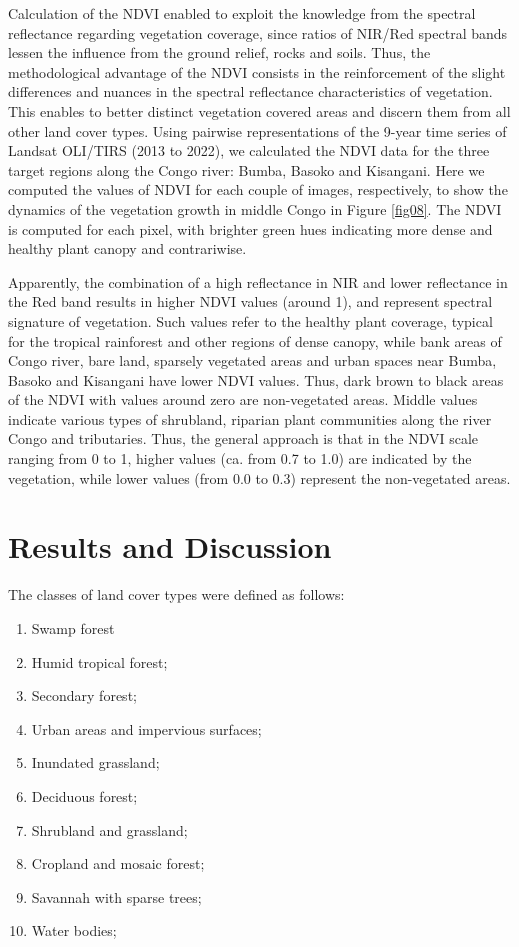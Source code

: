 \documentclass[applsci,article,submit,pdftex,moreauthors]{Definitions/mdpi}
\begin{document}
Calculation of the NDVI enabled to exploit the knowledge from the spectral reflectance regarding vegetation coverage, since ratios of NIR/Red spectral bands lessen the influence from the ground relief, rocks and soils. Thus, the methodological advantage of the NDVI consists in the reinforcement of the slight differences and nuances in the spectral reflectance characteristics of vegetation. This enables to better distinct vegetation covered areas and discern them from all other land cover types. Using pairwise representations of the 9-year time series of Landsat OLI/TIRS (2013 to 2022), we calculated the NDVI data for the three target regions along the Congo river: Bumba, Basoko and Kisangani. Here we computed the values of NDVI for each couple of images, respectively, to show the dynamics of the vegetation growth in middle Congo in Figure \ref{fig08}. The NDVI is computed for each pixel, with brighter green hues indicating more dense and healthy plant canopy and contrariwise. 

Apparently, the combination of a high reflectance in NIR and lower reflectance in the Red band results in higher NDVI values (around 1), and represent spectral signature of vegetation. Such values refer to the healthy plant coverage, typical for the tropical rainforest and other regions of dense canopy, while bank areas of Congo river, bare land, sparsely vegetated areas and urban spaces near Bumba, Basoko and Kisangani have lower NDVI values. Thus, dark brown to black areas of the NDVI with values around zero are non-vegetated areas. Middle values indicate various types of shrubland, riparian plant communities along the river Congo and tributaries. Thus, the general approach is that in the NDVI scale ranging from 0 to 1, higher values (ca. from 0.7 to 1.0) are indicated by the vegetation, while lower values (from 0.0 to 0.3) represent the non-vegetated areas. 

\section{Results and Discussion}

The classes of land cover types were defined as follows:
\begin{enumerate}
	\item	Swamp forest
	\item	Humid tropical forest;
	\item	Secondary forest;
	\item	Urban areas and impervious surfaces;
	\item Inundated grassland;
	\item Deciduous forest;
	\item Shrubland and grassland;
	\item Cropland and mosaic forest;
	\item Savannah with sparse trees;
	\item Water bodies;
\end{enumerate} 
\end{document}
